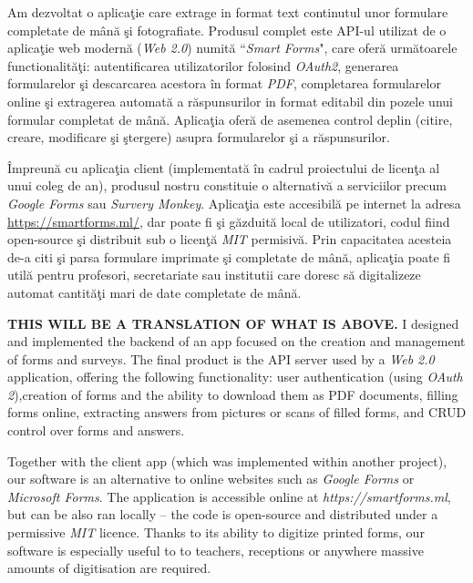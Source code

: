 \documentclass[11pt, a4paper]{report}
\newenvironment{abstractpage}
  {\cleardoublepage\vspace*{\fill}\thispagestyle{empty}}
  {\vfill\cleardoublepage}
\renewenvironment{abstract}[1]
  {\bigskip
  \begin{center}\bfseries\abstractname\end{center}}
  {\par\bigskip}
\begin{document}
\begin{abstractpage}

  \begin{abstract}{}
  Am dezvoltat o aplica\c tie care extrage in format text continutul unor formulare completate de m\^an\u a \c si fotografiate.
  Produsul complet este API-ul utilizat de o aplica\c{t}ie web modern\u{a} (\textit{Web 2.0}) numit\u{a} ``\textit{Smart Forms}", care ofer\u a urm\u atoarele functionalit\u a\c{t}i: autentificarea utilizatorilor folosind \textit{OAuth2}, generarea formularelor \c{s}i descarcarea acestora \^{i}n format \textit{PDF}, completarea formularelor online \c si extragerea automat\u{a} a r\u aspunsurilor in format editabil din pozele unui formular completat de m\^an\u a. Aplica\c tia ofer\u a de asemenea control deplin (citire, creare, modificare \c si \c{s}tergere) asupra formularelor \c{s}i a r\u{a}spunsurilor.
  
  \^{I}mpreun\u{a} cu aplica\c{t}ia client (implementat\u{a} \^ in cadrul proiectului de licen\c ta al unui coleg de an), produsul nostru constituie o alternativ\u a a serviciilor precum \textit{Google Forms} sau \textit{Survery Monkey}. Aplica\c tia este accesibil\u a pe internet la adresa \url{https://smartforms.ml/}, dar poate fi \c si g\u azduit\u a local de utilizatori, codul fiind open-source \c si distribuit sub o licen\c t\u a \textit{MIT} permisiv\u a. Prin capacitatea acesteia de-a citi \c si parsa formulare imprimate \c si completate de m\^ an\u a, aplica\c tia poate fi util\u a pentru profesori, secretariate sau institutii care doresc s\u a digitalizeze automat cantit\u a\c ti mari de date completate de m\^an\u a. 
  
  \end{abstract}
  
  \begin{abstract}{}
  \textbf{THIS WILL BE A TRANSLATION OF WHAT IS ABOVE.} I designed and implemented the backend of an app focused on the creation and management of forms and surveys. The final product is the API server used by a \textit{Web 2.0} application, offering the following functionality: user authentication (using \textit{OAuth 2}),creation of forms and the ability to download them as PDF documents, filling forms online, extracting answers from pictures or scans of filled forms, and CRUD control over forms and answers.
  
  Together with the client app (which was implemented within another project), our software is an alternative to online websites such as \textit{Google Forms} or \textit{Microsoft Forms}. The application is accessible online at \textit{https://smartforms.ml}, but can be also ran locally -- the code is open-source and distributed under a permissive \textit{MIT} licence. Thanks to its ability to digitize printed forms, our software is especially useful to to teachers, receptions or anywhere massive amounts of digitisation are required.
  \end{abstract}
  
\end{abstractpage}
\end{document}
